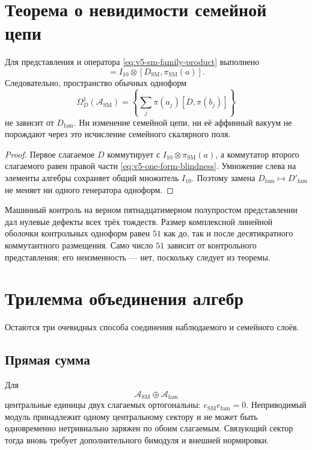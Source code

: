\section{Теорема о невидимости семейной цепи}

\begin{theorem}
Для представления и оператора \eqref{eq:v5-sm-family-product} выполнено
\begin{equation}
 [D,\pi(a)]
 =I_{10}\otimes[D_{\mathrm{SM}},\pi_{\mathrm{SM}}(a)].
 \label{eq:v5-one-form-blindness}
\end{equation}
Следовательно, пространство обычных одноформ
\begin{equation}
 \Omega_D^1(\mathcal A_{\mathrm{SM}})
 =\left\{\sum_j\pi(a_j)[D,\pi(b_j)]\right\}
\end{equation}
не зависит от $D_{\mathrm{fam}}$. Ни изменение семейной цепи, ни её
аффинный вакуум не порождают через это исчисление семейного скалярного поля.
\end{theorem}

\begin{proof}
Первое слагаемое $D$ коммутирует с $I_{10}\otimes\pi_{\mathrm{SM}}(a)$,
а коммутатор второго слагаемого равен правой части
\eqref{eq:v5-one-form-blindness}. Умножение слева на элементы алгебры
сохраняет общий множитель $I_{10}$. Поэтому замена
$D_{\mathrm{fam}}\mapsto D'_{\mathrm{fam}}$ не меняет ни одного генератора
одноформ.
\end{proof}

Машинный контроль на верном пятнадцатимерном полупростом представлении дал
нулевые дефекты всех трёх тождеств. Размер комплексной линейной оболочки
контрольных одноформ равен $51$ как до, так и после десятикратного
коммутантного размещения. Само число $51$ зависит от контрольного
представления; его неизменность --- нет, поскольку следует из теоремы.

\section{Трилемма объединения алгебр}

Остаются три очевидных способа соединения наблюдаемого и семейного слоёв.

\subsection{Прямая сумма}

Для
\begin{equation}
 \mathcal A_{\mathrm{SM}}\oplus\mathcal A_{\mathrm{fam}}
\end{equation}
центральные единицы двух слагаемых ортогональны:
$e_{\mathrm{SM}}e_{\mathrm{fam}}=0$. Неприводимый модуль принадлежит одному
центральному сектору и не может быть одновременно нетривиально заряжен по
обоим слагаемым. Связующий сектор тогда вновь требует дополнительного
бимодуля и внешней нормировки.

